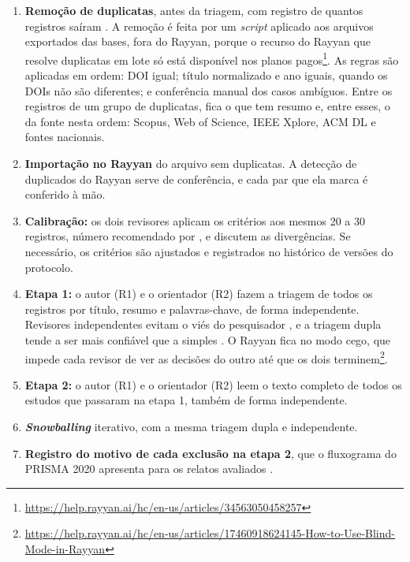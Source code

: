 \begin{enumerate}
	\item \textbf{Remoção de duplicatas}, antes da triagem, com registro de
	quantos registros saíram \cite[item 16a]{page2021ee}. A remoção é feita por
	um \textit{script} aplicado aos arquivos exportados das bases, fora do
	Rayyan, porque o recurso do Rayyan que resolve duplicatas em lote só está
	disponível nos planos
	pagos\footnote{\url{https://help.rayyan.ai/hc/en-us/articles/34563050458257}}.
	As regras são aplicadas em ordem: DOI igual; título normalizado e ano
	iguais, quando os DOIs não são diferentes; e conferência manual dos casos
	ambíguos. Entre os registros de um grupo de duplicatas, fica o que tem
	resumo e, entre esses, o da fonte nesta ordem: Scopus, Web of Science, IEEE
	Xplore, ACM DL e fontes nacionais.
	\item \textbf{Importação no Rayyan} \cite{ouzzani2016} do arquivo sem
	duplicatas. A detecção de duplicados do Rayyan serve de conferência, e
	cada par que ela marca é conferido à mão.
	\item \textbf{Calibração:} os dois revisores aplicam os critérios aos
	mesmos 20 a 30 registros, número recomendado por , e discutem as divergências. Se necessário, os critérios
	são ajustados e registrados no histórico de versões do protocolo.
	\item \textbf{Etapa 1:} o autor (R1) e o orientador (R2) fazem a triagem
	de todos os registros por título, resumo e palavras-chave, de forma
	independente. Revisores independentes evitam o viés do pesquisador
	\cite[seção 2.2]{kitchenham2023segress}, e a triagem dupla tende a ser
	mais confiável que a simples \cite[item 8]{page2021ee}. O Rayyan fica no
	modo cego, que impede cada revisor de ver as decisões do outro até que os
	dois
	terminem\footnote{\url{https://help.rayyan.ai/hc/en-us/articles/17460918624145-How-to-Use-Blind-Mode-in-Rayyan}}.
	\item \textbf{Etapa 2:} o autor (R1) e o orientador (R2) leem o texto
	completo de todos os estudos
	que passaram na etapa 1, também de forma independente.
	\item \textbf{\textit{Snowballing}} iterativo, com a mesma triagem dupla e
	independente.
	\item \textbf{Registro do motivo de cada exclusão na etapa 2}, que o
	fluxograma do PRISMA 2020 apresenta para os relatos avaliados
	\cite{page2021prisma}.
\end{enumerate}


